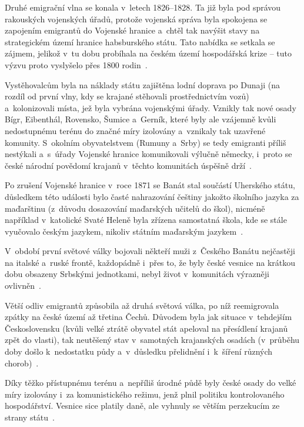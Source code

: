 Druhé emigrační vlna se konala v~letech 1826--1828. Ta již byla pod správou rakouských vojenských úřadů, protože vojenská správa byla spokojena se zapojením emigrantů do Vojenské hranice a~chtěl tak navýšit stavy na strategickém území hranice habsburského státu. Tato nabídka se setkala se zájmem, jelikož v~tu dobu probíhala na českém území hospodářská krize -- tuto výzvu proto vyslyšelo přes 1800 rodin~\parencite{Frnochova2012}.

Vystěhovalcům byla na náklady státu zajištěna lodní doprava po Dunaji (na rozdíl od první vlny, kdy se krajané stěhovali prostřednictvím vozů) a~kolonizovali místa, jež byla vybrána vojenskými úřady. Vznikly tak nové osady Bígr, Eibenthál, Rovensko, Šumice a~Gerník, které byly ale vzájemně kvůli nedostupnému terénu do značné míry izolovány a~vznikaly tak uzavřené komunity. S~okolním obyvatelstvem (Rumuny a~Srby) se tedy emigranti příliš nestýkali a~s~úřady Vojenské hranice komunikovali výlučně německy, i~proto se české národní povědomí krajanů v~těchto komunitách úspěšně drží~\parencite{Secka1995}.

Po zrušení Vojenské hranice v~roce 1871 se Banát stal součástí Uherského státu, důsledkem této události bylo časté nahrazování češtiny jakožto školního jazyka za maďarštinu (z~důvodu dosazování maďarských učitelů do škol), nicméně například v~katolické Svaté Heleně byla zřízena samostatná škola, kde se stále vyučovalo českým jazykem, nikoliv státním maďarským jazykem~\parencite{Vaculik2009a}.

V~období první světové války bojovali někteří muži z~Českého Banátu nejčastěji na italské a~ruské frontě, každopádně i~přes to, že byly české vesnice na krátkou dobu obsazeny Srbskými jednotkami, nebyl život v~komunitách výrazněji ovlivněn~\parencite{Gecse2013}.

Větší odliv emigrantů způsobila až druhá světová válka, po níž reemigrovala zpátky na české území až třetina Čechů. Důvodem byla jak situace v~tehdejším Československu (kvůli velké ztrátě obyvatel stát apeloval na přesídlení krajanů zpět do vlasti), tak neutěšený stav v~samotných krajanských osadách (v~průběhu doby došlo k~nedostatku půdy a~v~důsledku přelidnění i~k~šíření různých chorob)~\parencite{Secka1995}.

Díky těžko přístupnému terénu a~nepříliš úrodné půdě byly české osady do velké míry izolovány i~za komunistického režimu, jenž plnil politiku kontrolovaného hospodářství. Vesnice sice platily daně, ale vyhnuly se větším perzekucím ze strany státu~\parencite{Frnochova2012}.

